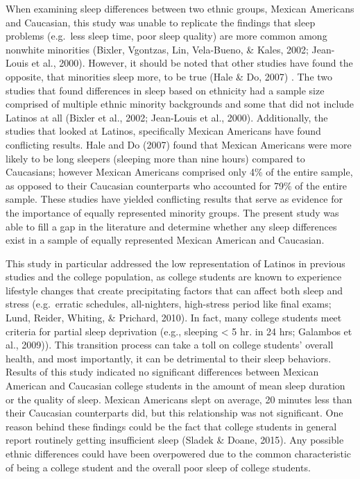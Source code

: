\documentclass[man, fleqn, noextraspace]{apa6}
\begin{document}
When examining sleep differences between two ethnic groups, Mexican Americans and Caucasian, this study was unable to replicate the findings that sleep problems (e.g.~less sleep time, poor sleep quality) are more common among nonwhite minorities (Bixler, Vgontzas, Lin, Vela-Bueno, \& Kales, 2002; Jean-Louis et al., 2000). However, it should be noted that other studies have found the opposite, that minorities sleep more, to be true (Hale \& Do, 2007) . The two studies that found differences in sleep based on ethnicity had a sample size comprised of multiple ethnic minority backgrounds and some that did not include Latinos at all (Bixler et al., 2002; Jean-Louis et al., 2000). Additionally, the studies that looked at Latinos, specifically Mexican Americans have found conflicting results. Hale and Do (2007) found that Mexican Americans were more likely to be long sleepers (sleeping more than nine hours) compared to Caucasians; however Mexican Americans comprised only 4\% of the entire sample, as opposed to their Caucasian counterparts who accounted for 79\% of the entire sample. These studies have yielded conflicting results that serve as evidence for the importance of equally represented minority groups.
The present study was able to fill a gap in the literature and determine whether any sleep differences exist in a sample of equally represented Mexican American and Caucasian.

This study in particular addressed the low representation of Latinos in previous studies and the college population, as college students are known to experience lifestyle changes that create precipitating factors that can affect both sleep and stress (e.g.~erratic schedules, all-nighters, high-stress period like final exams; Lund, Reider, Whiting, \& Prichard, 2010). In fact, many college students meet criteria for partial sleep deprivation (e.g., sleeping \textless{} 5 hr. in 24 hrs; Galambos et al., 2009)). This transition process can take a toll on college students' overall health, and most importantly, it can be detrimental to their sleep behaviors. Results of this study indicated no significant differences between Mexican American and Caucasian college students in the amount of mean sleep duration or the quality of sleep. Mexican Americans slept on average, 20 minutes less than their Caucasian counterparts did, but this relationship was not significant. One reason behind these findings could be the fact that college students in general report routinely getting insufficient sleep (Sladek \& Doane, 2015). Any possible ethnic differences could have been overpowered due to the common characteristic of being a college student and the overall poor sleep of college students.
\end{document}
